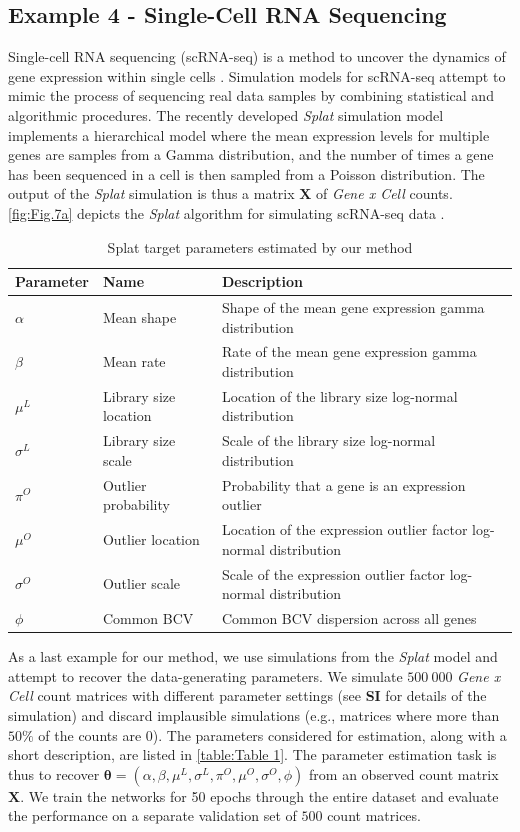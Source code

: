 \documentclass[9pt,twoside,lineno]{pnas-new}
\begin{document}
\subsection*{Example 4 - Single-Cell RNA Sequencing}
Single-cell RNA sequencing (scRNA-seq) is a method to uncover the dynamics of gene expression within single cells \cite{zappia2017splatter, ozsolak2011rna}. Simulation models for scRNA-seq attempt to mimic the process of sequencing real data samples by combining statistical and algorithmic procedures. The recently developed \textit{Splat} simulation model \cite{zappia2017splatter} implements a hierarchical model where the mean expression levels for multiple genes are samples from a Gamma distribution, and the number of times a gene has been sequenced in a cell is then sampled from a Poisson distribution. The output of the \textit{Splat} simulation is thus a matrix $\boldsymbol{X}$ of \textit{Gene x Cell} counts. \autoref{fig:Fig.7a} depicts the \textit{Splat} algorithm for simulating scRNA-seq data \cite{zappia2017splatter}.
\begin{table} 
\centering
\caption{Splat target parameters estimated by our method}
\begin{tabular}{lll}
Parameter & Name & Description\\
\midrule
$\alpha$ & Mean shape & Shape of the mean gene expression gamma distribution \\
$\beta$ & Mean rate & Rate of the mean gene expression gamma distribution \\
$\mu^{L}$ & Library size location & Location of the library size log-normal distribution \\
$\sigma^{L}$ & Library size scale & Scale of the library size log-normal distribution \\
$\pi^{O}$ & Outlier probability & Probability that a gene is an expression outlier \\
$\mu^{O}$ & Outlier location & Location of the expression outlier factor log-normal distribution \\
$\sigma^{O}$ & Outlier scale & Scale of the expression outlier factor log-normal distribution \\
$\phi$ & Common BCV & Common BCV dispersion across all genes \\
\bottomrule
\end{tabular}
\label{table:Table 1}
\end{table}
As a last example for our method, we use simulations from the \textit{Splat} model and attempt to recover the data-generating parameters. We simulate $500\ 000$  \textit{Gene x Cell} count matrices with different parameter settings (see \textbf{SI} for details of the simulation) and discard implausible simulations (e.g., matrices where more than $50\%$ of the counts are $0$). The parameters considered for estimation, along with a short description, are listed in \autoref{table:Table 1}. The parameter estimation task is thus to recover $\boldsymbol{\theta} = (\alpha,\beta,\mu^{L},\sigma^{L},\pi^{O},\mu^{O},\sigma^{O},\phi)$ from an observed count matrix $\boldsymbol{X}$. We train the networks for 50 epochs through the entire dataset and evaluate the performance on a separate validation set of $500$ count matrices.
\end{document}
